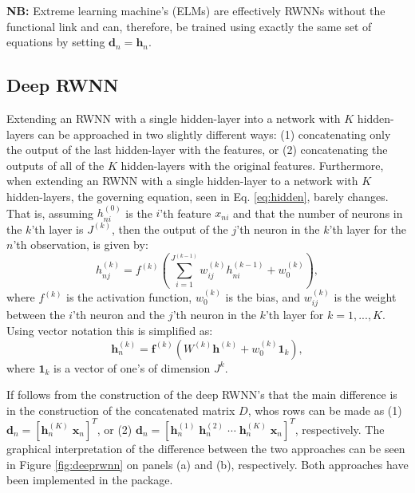 \documentclass[
]{jss}
\begin{document}
\textbf{NB:} Extreme learning machine's (ELMs) are effectively RWNNs
without the functional link and can, therefore, be trained using exactly
the same set of equations by setting
\(\boldsymbol d_n = \boldsymbol h_n\).

\hypertarget{deepRWNN}{%
\subsection{Deep RWNN}\label{deepRWNN}}

Extending an RWNN with a single hidden-layer into a network with \(K\)
hidden-layers can be approached in two slightly different ways: (1)
concatenating only the output of the last hidden-layer with the
features, or (2) concatenating the outputs of all of the \(K\)
hidden-layers with the original features. Furthermore, when extending an
RWNN with a single hidden-layer to a network with \(K\) hidden-layers,
the governing equation, seen in Eq. \eqref{eq:hidden}, barely changes.
That is, assuming \(h_{ni}^{(0)}\) is the \(i\)'th feature \(x_{ni}\)
and that the number of neurons in the \(k\)'th layer is \(J^{(k)}\),
then the output of the \(j\)'th neuron in the \(k\)'th layer for the
\(n\)'th observation, is given by: \begin{equation}
h_{nj}^{(k)} = f^{(k)}\left(\sum_{i = 1}^{J^{(k - 1)}} w^{(k)}_{ij} h_{ni}^{(k - 1)} + w^{(k)}_{0}\right), \label{eq:hidden2}
\end{equation} where \(f^{(k)}\) is the activation function,
\(w^{(k)}_0\) is the bias, and \(w^{(k)}_{ij}\) is the weight between
the \(i\)'th neuron and the \(j\)'th neuron in the \(k\)'th layer for
\(k = 1, ..., K\). Using vector notation this is simplified as:
\begin{equation}
\boldsymbol h_n^{(k)} = \boldsymbol f^{(k)}\left(W^{(k)} \boldsymbol{h}^{(k)} + w^{(k)}_0 \boldsymbol{1}_{k}\right),
\end{equation} where \(\boldsymbol{1}_k\) is a vector of one's of
dimension \(J^{k}\).

If follows from the construction of the deep RWNN's that the main
difference is in the construction of the concatenated matrix \(D\), whos
rows can be made as (1)
\(\boldsymbol{d}_n = [\boldsymbol h_n^{(K)} \; \boldsymbol x_n]^T\), or
(2)
\(\boldsymbol{d}_n = [\boldsymbol h_n^{(1)} \; \boldsymbol h_n^{(2)} \; \cdots \; \boldsymbol h_n^{(K)} \; \boldsymbol x_n]^T\),
respectively. The graphical interpretation of the difference between the
two approaches can be seen in Figure \ref{fig:deeprwnn} on panels (a)
and (b), respectively. Both approaches have been implemented in the
 package.
\end{document}
